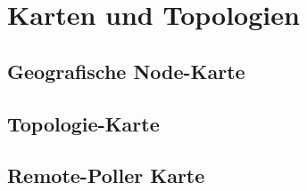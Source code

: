 \section{Karten und Topologien}

\subsection{Geografische Node-Karte}

\subsection{Topologie-Karte}

\subsection{Remote-Poller Karte}
